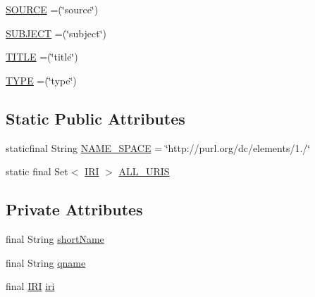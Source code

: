 \begin{DoxyCompactItemize}
\item 
\hyperlink{enumorg_1_1semanticweb_1_1owlapi_1_1vocab_1_1_dublin_core_vocabulary_a19d5269864556944d177b410877c0fa1}{S\-O\-U\-R\-C\-E} =(\char`\"{}source\char`\"{})
\item 
\hyperlink{enumorg_1_1semanticweb_1_1owlapi_1_1vocab_1_1_dublin_core_vocabulary_af4c38c22158280f064ec829a9c9fd87b}{S\-U\-B\-J\-E\-C\-T} =(\char`\"{}subject\char`\"{})
\item 
\hyperlink{enumorg_1_1semanticweb_1_1owlapi_1_1vocab_1_1_dublin_core_vocabulary_acb8bfac585a3d798fdd0d1b663bd488d}{T\-I\-T\-L\-E} =(\char`\"{}title\char`\"{})
\item 
\hyperlink{enumorg_1_1semanticweb_1_1owlapi_1_1vocab_1_1_dublin_core_vocabulary_a94b31627419460af0d5b2d09949d76c7}{T\-Y\-P\-E} =(\char`\"{}type\char`\"{})
\end{DoxyCompactItemize}
\subsection*{Static Public Attributes}
\begin{DoxyCompactItemize}
\item 
staticfinal String \hyperlink{enumorg_1_1semanticweb_1_1owlapi_1_1vocab_1_1_dublin_core_vocabulary_a299076f0423b1db0ac0ca527e5ec12f5}{N\-A\-M\-E\-\_\-\-S\-P\-A\-C\-E} = \char`\"{}http\-://purl.\-org/dc/elements/1./\char`\"{}
\item 
static final Set$<$ \hyperlink{classorg_1_1semanticweb_1_1owlapi_1_1model_1_1_i_r_i}{I\-R\-I} $>$ \hyperlink{enumorg_1_1semanticweb_1_1owlapi_1_1vocab_1_1_dublin_core_vocabulary_a6590d4f0278509f0236d245ca98a5054}{A\-L\-L\-\_\-\-U\-R\-I\-S}
\end{DoxyCompactItemize}
\subsection*{Private Attributes}
\begin{DoxyCompactItemize}
\item 
final String \hyperlink{enumorg_1_1semanticweb_1_1owlapi_1_1vocab_1_1_dublin_core_vocabulary_a489c5944f769b17c75c0b110fd4eca82}{short\-Name}
\item 
final String \hyperlink{enumorg_1_1semanticweb_1_1owlapi_1_1vocab_1_1_dublin_core_vocabulary_ac562e69fd183ba342319c5eb831d3242}{qname}
\item 
final \hyperlink{classorg_1_1semanticweb_1_1owlapi_1_1model_1_1_i_r_i}{I\-R\-I} \hyperlink{enumorg_1_1semanticweb_1_1owlapi_1_1vocab_1_1_dublin_core_vocabulary_a022ade4b7873766dfcb3d96a3682ac18}{iri}
\end{DoxyCompactItemize}


